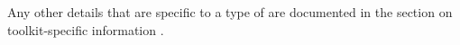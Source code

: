 Any other details that are specific to a type of \gdaut{} are documented in the section on toolkit-specific information . 
